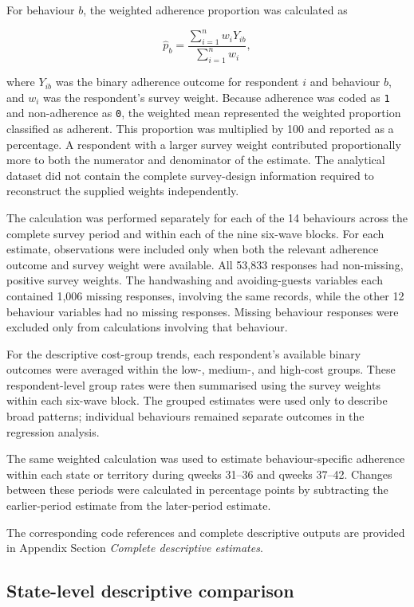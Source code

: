 \documentclass[
  12pt,
  a4paper,
]{article}
\begin{document}
For behaviour \(b\), the weighted adherence proportion was calculated as

\[
\widehat{p}_{b}
=
\frac{\sum_{i=1}^{n} w_iY_{ib}}
     {\sum_{i=1}^{n} w_i},
\]

where \(Y_{ib}\) was the binary adherence outcome for respondent \(i\) and
behaviour \(b\), and \(w_i\) was the respondent's survey weight. Because
adherence was coded as \texttt{1} and non-adherence as \texttt{0}, the weighted mean
represented the weighted proportion classified as adherent. This
proportion was multiplied by 100 and reported as a percentage. A
respondent with a larger survey weight contributed proportionally more
to both the numerator and denominator of the estimate. The analytical
dataset did not contain the complete survey-design information required
to reconstruct the supplied weights independently.

The calculation was performed separately for each of the 14 behaviours
across the complete survey period and within each of the nine six-wave
blocks. For each estimate, observations were included only when both the
relevant adherence outcome and survey weight were available. All 53,833
responses had non-missing, positive survey weights. The handwashing and
avoiding-guests variables each contained 1,006 missing responses,
involving the same records, while the other 12 behaviour variables had
no missing responses. Missing behaviour responses were excluded only
from calculations involving that behaviour.

For the descriptive cost-group trends, each respondent's available
binary outcomes were averaged within the low-, medium-, and high-cost
groups. These respondent-level group rates were then summarised using
the survey weights within each six-wave block. The grouped estimates
were used only to describe broad patterns; individual behaviours
remained separate outcomes in the regression analysis.

The same weighted calculation was used to estimate behaviour-specific
adherence within each state or territory during qweeks 31--36 and qweeks
37--42. Changes between these periods were calculated in percentage
points by subtracting the earlier-period estimate from the later-period
estimate.

The corresponding code references and complete descriptive outputs are
provided in Appendix Section \emph{Complete descriptive estimates}.

\subsection{State-level descriptive comparison}\label{state-level-descriptive-comparison}
\end{document}
